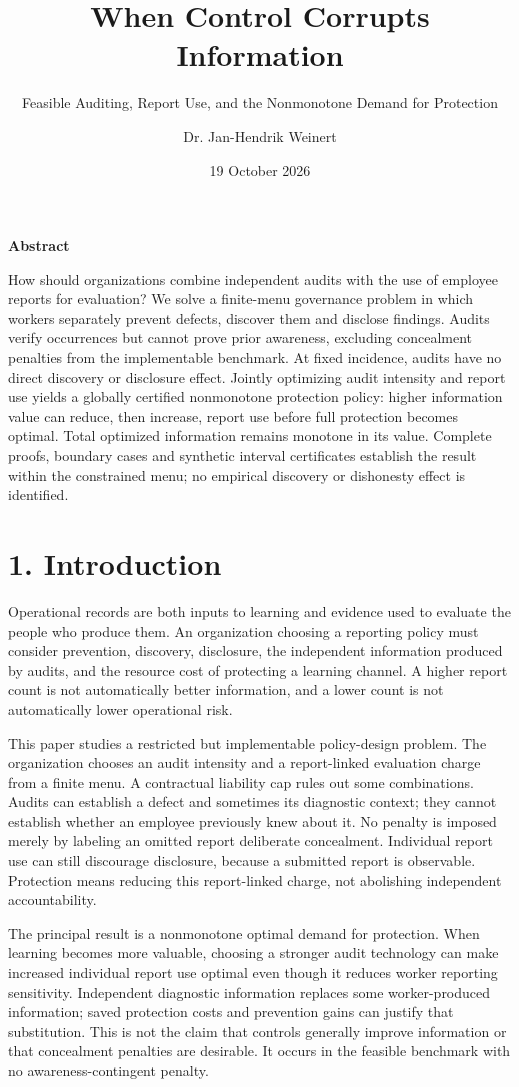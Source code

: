 \documentclass[
  11pt,
]{article}
\title{When Control Corrupts Information}
\subtitle{Feasible Auditing, Report Use, and the Nonmonotone Demand for
Protection}
\author{Dr. Jan-Hendrik Weinert}
\date{19 October 2026}
\makeatletter
\renewcommand{\maketitle}{%
  \begin{center}
  {\LARGE\bfseries\@title\par}
  \vspace{0.8em}
  {\normalsize\@author\par}
  \vspace{0.35em}
  {\small\@date\par}
  \end{center}
  \vspace{0.4em}}
\renewenvironment{abstract}{%
  \begin{center}\small\bfseries Abstract\end{center}
  \begin{list}{}{\setlength{\leftmargin}{0.5in}\setlength{\rightmargin}{0.5in}}
  \item[]\small\setlength{\parindent}{0pt}\ignorespaces
}{\end{list}\vspace{0.6em}}
\makeatother
\begin{document}
\maketitle
\begin{abstract}
How should organizations combine independent audits with the use of employee reports for evaluation? We solve a finite-menu governance problem in which workers separately prevent defects, discover them and disclose findings. Audits verify occurrences but cannot prove prior awareness, excluding concealment penalties from the implementable benchmark. At fixed incidence, audits have no direct discovery or disclosure effect. Jointly optimizing audit intensity and report use yields a globally certified nonmonotone protection policy: higher information value can reduce, then increase, report use before full protection becomes optimal. Total optimized information remains monotone in its value. Complete proofs, boundary cases and synthetic interval certificates establish the result within the constrained menu; no empirical discovery or dishonesty effect is identified.
\end{abstract}
\section{1. Introduction}\label{the-governance-question}

Operational records are both inputs to learning and evidence used to
evaluate the people who produce them. An organization choosing a
reporting policy must consider prevention, discovery, disclosure, the
independent information produced by audits, and the resource cost of
protecting a learning channel. A higher report count is not
automatically better information, and a lower count is not automatically
lower operational risk.

This paper studies a restricted but implementable policy-design problem.
The organization chooses an audit intensity and a report-linked
evaluation charge from a finite menu. A contractual liability cap rules
out some combinations. Audits can establish a defect and sometimes its
diagnostic context; they cannot establish whether an employee previously
knew about it. No penalty is imposed merely by labeling an omitted
report deliberate concealment. Individual report use can still
discourage disclosure, because a submitted report is observable.
Protection means reducing this report-linked charge, not abolishing
independent accountability.

The principal result is a nonmonotone optimal demand for protection.
When learning becomes more valuable, choosing a stronger audit
technology can make increased individual report use optimal even though
it reduces worker reporting sensitivity. Independent diagnostic
information replaces some worker-produced information; saved protection
costs and prevention gains can justify that substitution. This is not
the claim that controls generally improve information or that
concealment penalties are desirable. It occurs in the feasible benchmark
with no awareness-contingent penalty.
\end{document}
